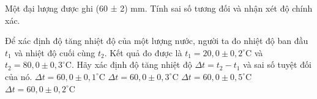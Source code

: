 
\begin{bt}
Một đại lượng được ghi (60 ± 2) mm. Tính sai số tương đối và nhận xét độ chính xác.
\end{bt}


\begin{ex}
Để xác định độ tăng nhiệt độ của một lượng nước, người ta đo nhiệt độ ban đầu $t_1$ và nhiệt độ cuối cùng $t_2$. Kết quả đo được là $t_1 = 20,0 \pm 0,2^\circ\text{C}$ và $t_2 = 80,0 \pm 0,3^\circ\text{C}$. Hãy xác định độ tăng nhiệt độ $\Delta t = t_2 - t_1$ và sai số tuyệt đối của nó.
\choice
{$\Delta t = 60,0 \pm 0,1^\circ\text{C}$}
{$\Delta t = 60,0 \pm 0,3^\circ\text{C}$}
{\True $\Delta t = 60,0 \pm 0,5^\circ\text{C}$}
{$\Delta t = 60,0 \pm 0,2^\circ\text{C}$}
\end{ex}

